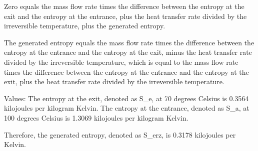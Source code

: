 Zero equals the mass flow rate times the difference between the entropy at the exit and the entropy at the entrance, plus the heat transfer rate divided by the irreversible temperature, plus the generated entropy.

The generated entropy equals the mass flow rate times the difference between the entropy at the entrance and the entropy at the exit, minus the heat transfer rate divided by the irreversible temperature, which is equal to the mass flow rate times the difference between the entropy at the entrance and the entropy at the exit, plus the heat transfer rate divided by the irreversible temperature.

Values:
The entropy at the exit, denoted as S_e, at 70 degrees Celsius is 0.3564 kilojoules per kilogram Kelvin.
The entropy at the entrance, denoted as S_a, at 100 degrees Celsius is 1.3069 kilojoules per kilogram Kelvin.

Therefore, the generated entropy, denoted as S_erz, is 0.3178 kilojoules per Kelvin.